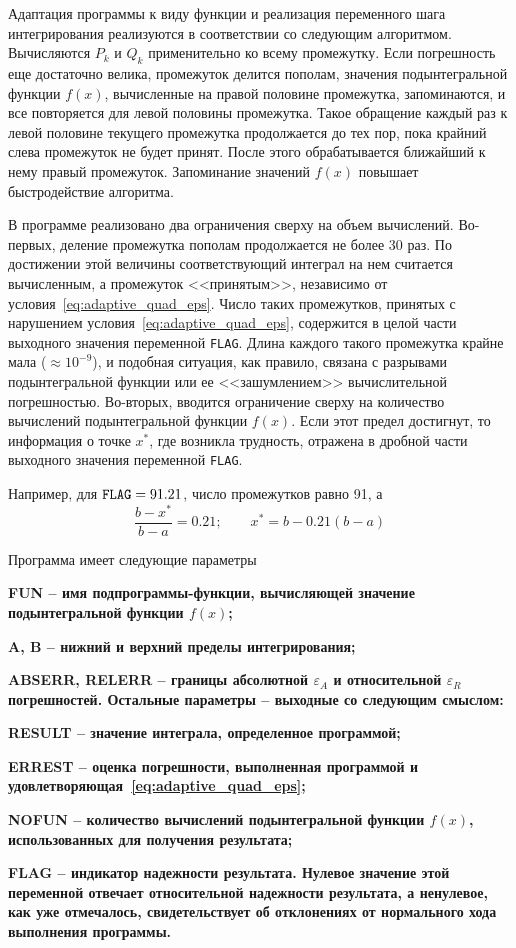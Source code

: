 Адаптация программы к виду функции и реализация переменного шага интегрирования реализуются в соответствии со следующим
алгоритмом. Вычисляются $P_k$ и $Q_k$ применительно ко всему промежутку. Если погрешность еще достаточно велика,
промежуток делится пополам, значения подынтегральной функции $f(x)$, вычисленные на правой половине промежутка,
запоминаются, и все повторяется для левой половины промежутка. Такое обращение каждый раз к левой половине текущего
промежутка продолжается до тех пор, пока крайний слева промежуток не будет принят. После этого обрабатывается ближайший
к нему правый промежуток. Запоминание значений $f(x)$ повышает быстродействие алгоритма.

В программе реализовано два ограничения сверху на объем вычислений. Во-первых, деление промежутка пополам продолжается
не более 30 раз. По достижении этой величины соответствующий интеграл на нем считается вычисленным, а промежуток
<<принятым>>, независимо от условия~\eqref{eq:adaptive_quad_eps}. Число таких промежутков, принятых с нарушением
условия~\eqref{eq:adaptive_quad_eps}, содержится в целой части выходного значения переменной \verb|FLAG|. Длина каждого
такого промежутка крайне мала ($\displaystyle \approx 10^{-9}$), и подобная ситуация, как правило, связана с разрывами
подынтегральной функции или ее <<зашумлением>> вычислительной погрешностью. Во-вторых, вводится ограничение сверху на
количество вычислений подынтегральной функции $f(x)$. Если этот предел достигнут, то информация о точке
$\displaystyle x^{*}$, где возникла трудность, отражена в дробной части выходного значения переменной \verb|FLAG|.

Например, для $\verb|FLAG| = 91.21$, число промежутков равно 91, а
\begin{equation*}
    \frac{b-x^{*}}{b-a} = 0.21; \qquad x^{*} = b - 0.21(b-a)
\end{equation*}

Программа имеет следующие параметры

\bf{FUN} -- имя подпрограммы-функции, вычисляющей значение подынтегральной функции $f(x)$;

\bf{A, B} -- нижний и верхний пределы интегрирования;

\bf{ABSERR, RELERR} -- границы абсолютной $\varepsilon_A$ и относительной $\varepsilon_R$ погрешностей. Остальные параметры -- выходные со
следующим смыслом:

\bf{RESULT} -- значение интеграла, определенное программой;

\bf{ERREST} -- оценка погрешности, выполненная программой и удовлетворяющая~\eqref{eq:adaptive_quad_eps};

\bf{NOFUN} -- количество вычислений подынтегральной функции $f(x)$, использованных для получения результата;

\bf{FLAG} -- индикатор надежности результата. Нулевое значение этой переменной отвечает относительной надежности
результата, а ненулевое, как уже отмечалось, свидетельствует об отклонениях от нормального хода выполнения программы.
